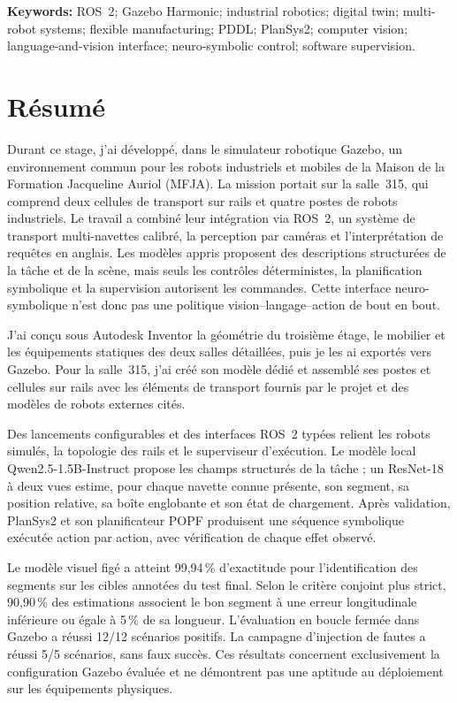 \textbf{Keywords:} ROS~2; Gazebo Harmonic; industrial robotics; digital twin;
multi-robot systems; flexible manufacturing; PDDL; PlanSys2; computer vision;
language-and-vision interface; neuro-symbolic control; software supervision.

\cleardoublepage
\chapter*{Résumé}
Durant ce stage, j'ai développé, dans le simulateur robotique Gazebo, un
environnement commun pour les robots industriels et mobiles de la Maison de la
Formation Jacqueline Auriol (MFJA). La mission portait sur la salle~315, qui
comprend deux cellules de transport sur rails et quatre postes de robots
industriels. Le travail a combiné leur intégration via ROS~2, un système de
transport multi-navettes calibré, la perception par caméras et l'interprétation
de requêtes en anglais. Les modèles appris proposent des descriptions
structurées de la tâche et de la scène, mais seuls les contrôles déterministes,
la planification symbolique et la supervision autorisent les commandes. Cette
interface neuro-symbolique n'est donc pas une politique
vision--langage--action de bout en bout.

J'ai conçu sous Autodesk Inventor la géométrie du troisième étage, le mobilier
et les équipements statiques des deux salles détaillées, puis je les ai exportés
vers Gazebo. Pour la salle~315, j'ai créé son modèle dédié et assemblé ses postes
et cellules sur rails avec les éléments de transport fournis par le projet et
des modèles de robots externes cités.

Des lancements configurables et des interfaces ROS~2 typées relient les robots
simulés, la topologie des rails et le superviseur d'exécution. Le modèle local
Qwen2.5-1.5B-Instruct propose les champs structurés de la tâche ; un ResNet-18 à
deux vues estime, pour chaque navette connue présente, son segment, sa position
relative, sa boîte englobante et son état de chargement. Après validation,
PlanSys2 et son planificateur POPF produisent une séquence symbolique exécutée
action par action, avec vérification de chaque effet observé.

Le modèle visuel figé a atteint 99,94\,\% d'exactitude pour l'identification des
segments sur les cibles annotées du test final. Selon le critère conjoint plus
strict, 90,90\,\% des estimations associent le bon segment à une erreur
longitudinale inférieure ou égale à 5\,\% de sa longueur. L'évaluation en boucle
fermée dans Gazebo a réussi 12/12 scénarios positifs. La campagne d'injection de
fautes a réussi 5/5 scénarios, sans faux succès. Ces résultats concernent
exclusivement la configuration Gazebo évaluée et ne démontrent pas une aptitude
au déploiement sur les équipements physiques.

